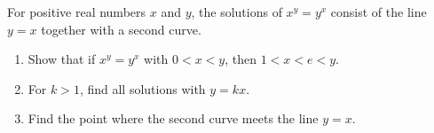 For positive real numbers $x$ and $y$, the solutions of $x^y=y^x$ consist of the line $y=x$ together with a second curve.
\begin{enumerate}
\item[(a)] Show that if $x^y=y^x$ with $0<x<y$, then $1<x<e<y$.
\item[(b)] For $k>1$, find all solutions with $y=kx$.
\item[(c)] Find the point where the second curve meets the line $y=x$.
\end{enumerate}
